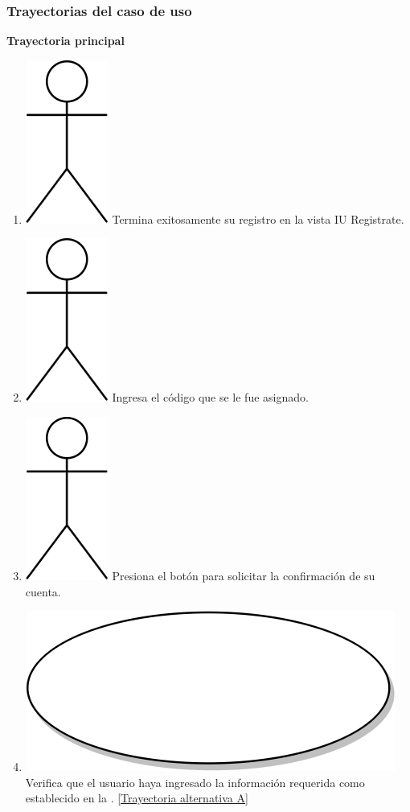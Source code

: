 \subsubsection{Trayectorias del caso de uso}
\textbf{Trayectoria principal}
\begin{enumerate}
  \item {\includegraphics[scale=.1]{Capitulo3/img/actor.png} Termina exitosamente su registro en la vista IU Registrate.}
  \item {\includegraphics[scale=.1]{Capitulo3/img/actor.png} Ingresa el código que se le fue asignado.}
  \item {\includegraphics[scale=.1]{Capitulo3/img/actor.png} Presiona el botón para solicitar la confirmación de su cuenta.}
  \item {\includegraphics[scale=.05]{Capitulo3/img/proceso.png} Verifica que el usuario haya ingresado la información requerida como establecido en la \hyperref[]{}. \hyperref[cu2_1_ta_a]{[Trayectoria alternativa A]}}

\end{enumerate}
